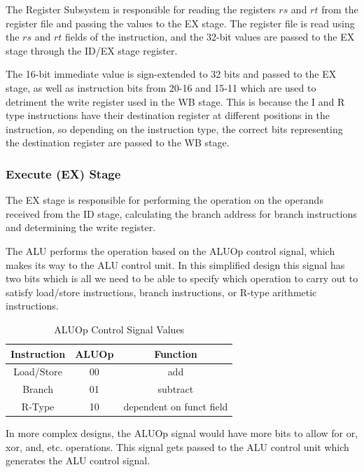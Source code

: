 The Register Subsystem is responsible for reading the registers $rs$ and $rt$ from the register file and passing the values to the EX stage. The register file is read using the $rs$ and $rt$ fields of the instruction, and the 32-bit values are passed to the EX stage through the ID/EX stage register.

The 16-bit immediate value is sign-extended to 32 bits and passed to the EX stage, as well as instruction bits from 20-16 and 15-11 which are used to detriment the write register used in the WB stage. This is because the I and R type instructions have their destination register at different positions in the instruction, so depending on the instruction type, the correct bits representing the destination register are passed to the WB stage.

\subsubsection{Execute (EX) Stage}
The EX stage is responsible for performing the operation on the operands received from the ID stage, calculating the branch address for branch instructions and determining the write register. 

The ALU performs the operation based on the ALUOp control signal, which makes its way to the ALU control unit. In this simplified design this signal has two bits which is all we need to be able to specify which operation to carry out to satisfy load/store instructions, branch instructions, or R-type arithmetic instructions.
\begin{table}[H]
    \centering
    \begin{tabular}{|c|c|c|}
    \hline
    \textbf{Instruction} &  \textbf{ALUOp} & \textbf{Function} \\ \hline
    Load/Store         & 00             & add  \\ \hline
    Branch            & 01             & subtract \\ \hline
    R-Type         & 10             & dependent on funct field \\ \hline
    \end{tabular}
    \caption{ALUOp Control Signal Values}
    \label{tab:aluop_values}
\end{table}

In more complex designs, the ALUOp signal would have more bits to allow for or, xor, and, etc. operations. This signal gets passed to the ALU control unit which generates the ALU control signal.

